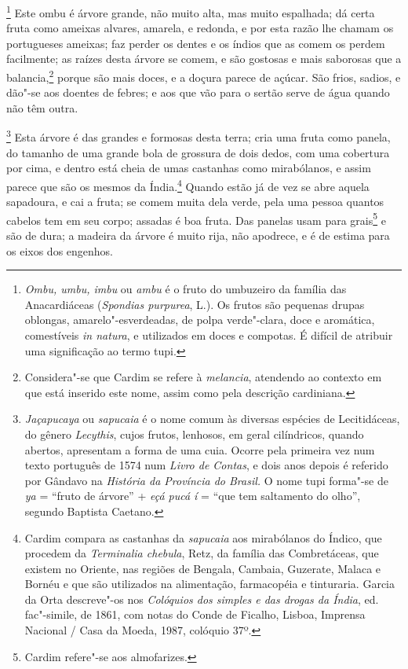 \footnote{ \textit{Ombu, umbu, imbu} ou \textit{ambu} é
o fruto do umbuzeiro da família das Anacardiáceas (\textit{Spondias
purpurea}, L.). Os frutos são pequenas drupas oblongas,
amarelo"-esverdeadas, de polpa verde"-clara, doce e aromática,
comestíveis \textit{in natura}, e utilizados em doces e compotas. É
difícil de atribuir uma significação ao termo tupi.} Este
ombu é árvore grande, não muito alta, mas muito espalhada; dá certa
fruta como ameixas alvares, amarela, e redonda, e por esta razão lhe
chamam os portugueses ameixas; faz perder os dentes e os índios que as
comem os perdem facilmente; as raízes desta árvore se comem, e são
gostosas e mais saborosas que a balancia,\footnote{ Considera"-se que
Cardim se refere à \textit{melancia}, atendendo ao contexto em que está
inserido este nome, assim como pela descrição cardiniana.} porque
são mais doces, e a doçura parece de açúcar. São frios, sadios, e
dão"-se aos doentes de febres; e aos que vão para o sertão serve de água
quando não têm outra. 

\footnote{ \textit{Jaçapucaya} ou \textit{sapucaia} 
é o nome comum às diversas espécies de Lecitidáceas, do gênero
\textit{Lecythis}, cujos frutos, lenhosos, em geral cilíndricos, quando
abertos, apresentam a forma de uma cuia. Ocorre pela primeira vez num
texto português de 1574 num \textit{Livro de Contas}, e dois anos
depois é referido por Gândavo na \textit{História da Província do
Brasil.} O nome tupi forma"-se de \textit{ya} = ``fruto de árvore'' +
\textit{eçá pucá í} = ``que tem saltamento do olho'', segundo Baptista
Caetano.} Esta árvore é das grandes e formosas desta terra;
cria uma fruta como panela, do tamanho de uma grande bola de grossura
de dois dedos, com uma cobertura por cima, e dentro está cheia de umas
castanhas como mirabólanos, e assim parece que são os mesmos da
Índia.\footnote{ Cardim compara as castanhas da \textit{sapucaia} aos
mirabólanos do Índico, que procedem da \textit{Terminalia chebula}, 
Retz, da família das Combretáceas, que existem no Oriente, nas regiões
de Bengala, Cambaia, Guzerate, Malaca e Bornéu e que são utilizados na
alimentação, farmacopéia e tinturaria. Garcia da Orta descreve"-os nos
\textit{Colóquios dos simples e das drogas da Índia}, ed. fac"-simile,
de 1861, com notas do Conde de Ficalho, Lisboa, Imprensa Nacional / 
Casa da Moeda, 1987, colóquio 37º.} Quando estão já de vez se abre
aquela sapadoura, e cai a fruta; se comem muita dela verde, pela uma
pessoa quantos cabelos tem em seu corpo; assadas é boa fruta. Das
panelas usam para grais\footnote{ Cardim refere"-se aos almofarizes.} e
são de dura; a madeira da árvore é muito rija, não apodrece, e é de
estima para os eixos dos engenhos.

